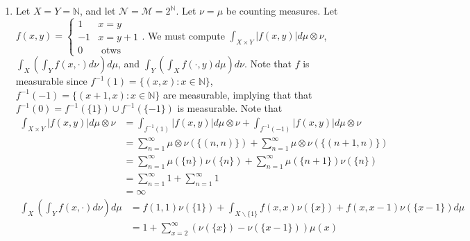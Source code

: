 \documentclass[12pt, letterpaper]{article}
\newcommand{\N}{\mathbb{N}}
\begin{document}
\begin{enumerate}
\begin{enumerate}
		\item We want to compute $\int_X (\int_Y f(x,\cdot)d \nu )d \mu$ and 
		$\int_Y (\int_X f(\cdot,y)d \mu) d \nu$ 
		\begin{itemize}
			\item For $\int_X (\int_Y f(x,\cdot)d \nu )d \mu$, note that 
			$\int_Y f(x,\cdot) \nu = 1$ since $f(x,\cdot) = 1_{\{x\}}(y)$ giving us
			$\int_Y f(x,\cdot0) \nu = \nu(\{x\}) = 1$.  Therefore 
			$\int_X (\int_Y f(x,\cdot)d \nu )d \mu = \int_X 1d \mu =1$
			\item For $\int_Y (\int_X f(\cdot,y)d \mu) d \nu$, note that 
			$\int_X f(\cdot,y)d \mu = 0$ by similar reasoning above, with the exception
			being that $\mu(\{y\}) = 0$.  Thus the entire integral is 0.
		\end{itemize}
	\end{enumerate}
	\item Let $X = Y = \N$, and let $\mathcal{N} = \mathcal{M} = 2^\N$.  Let 
	$\nu = \mu$ be counting measures.  Let 
	$f(x,y) = \begin{cases}1 & x = y\\ -1 & x = y + 1 \\ 0 & \text{ otws}\end{cases}$.
	We must compute $\int_{X \times Y} |f(x,y)| d \mu \otimes \nu$, 
	$\int_X (\int_Y f(x,\cdot)d \nu )d \mu$, and 
		$\int_Y (\int_X f(\cdot,y)d \mu) d \nu$.  Note that 
		$f$ is measurable since $f^{-1}(1) = \{(x,x): x \in \N\}$,
		$f^{-1}(-1) = \{(x+1,x): x \in \N\}$ are measurable, implying that that 
		$f^{-1}(0) = f^{-1}(\{1\}) \cup f^{-1}(\{-1\})$ is measurable.  Note that 
		\begin{align*}
			\int_{X \times Y} |f(x,y)| d \mu \otimes \nu &= \int_{f^{-1}(1)} |f(x,y)| d \mu \otimes \nu + \int_{f^{-1}(-1)} |f(x,y)| d \mu \otimes \nu\\
			&= \sum_{n=1}^\infty \mu \otimes \nu(\{(n,n)\}) + \sum_{n=1}^\infty \mu \otimes \nu(\{(n+1,n)\})\\
			&= \sum_{n=1}^\infty \mu(\{n\}) \nu(\{n\}) + \sum_{n=1}^\infty \mu(\{n+1\}) \nu(\{n\})\\
			&= \sum_{n=1}^\infty 1 + \sum_{n=1}^\infty 1\\
			&= \infty
		\end{align*}		 
		\begin{align*}
			\int_X (\int_Y f(x,\cdot)d \nu )d \mu &=f(1,1)\nu(\{1\})  +  \int_{X\backslash \{1\}} f(x,x)\nu(\{x\}) + f(x,x-1)\nu(\{x-1\})  d\mu\\
			&= 1 + \sum_{x=2}^\infty (\nu(\{x\}) - \nu(\{x-1\}))\mu(x)\\

\end{align*}
\end{enumerate}
\end{document}
